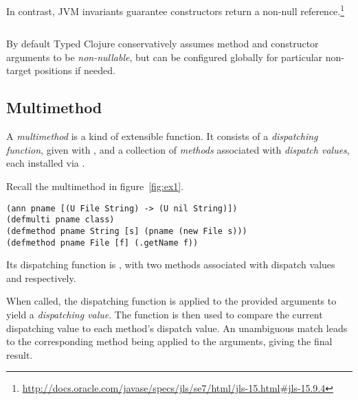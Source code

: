 %

In contrast, JVM invariants guarantee constructors return a non-null reference.\footnote{\url{http://docs.oracle.com/javase/specs/jls/se7/html/jls-15.html#jls-15.9.4}}

\begin{exmp}
\inputminted[firstline=15,lastline=16]{clojure}{code/demo/src/demo/parent3.clj}
\end{exmp}

By default Typed Clojure conservatively assumes method and constructor arguments to be \emph{non-nullable},
but can be configured globally for particular non-target positions if needed.

\subsection{Multimethod}

A \emph{multimethod} is a kind of extensible function. It consists of
a \emph{dispatching function}, given with , and a collection of \emph{methods} associated with
\emph{dispatch values}, each installed via .

Recall the multimethod in figure~\ref{fig:ex1}. 

\begin{verbatim}
(ann pname [(U File String) -> (U nil String)])
(defmulti pname class)
(defmethod pname String [s] (pname (new File s)))
(defmethod pname File [f] (.getName f))
\end{verbatim}

Its dispatching function is
, with two methods associated with dispatch values  and 
respectively.

When called, the dispatching function is applied to the provided arguments to
yield a \emph{dispatching value}.
The  function is then used to compare the current dispatching value to each method's dispatch value.
An unambiguous match leads to the corresponding method being applied to the arguments,
giving the final result.

